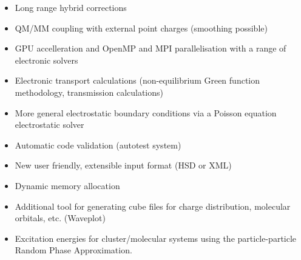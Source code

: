 \begin{itemize}
\item Long range hybrid corrections
\item QM/MM coupling with external point charges (smoothing possible)
\item GPU accelleration and OpenMP and MPI parallelisation with a
  range of electronic solvers
\item Electronic transport calculations (non-equilibrium Green function
  methodology, transmission calculations)
\item More general electrostatic boundary conditions via a Poisson equation
  electrostatic solver
\item Automatic code validation (autotest system)
\item New user friendly, extensible input format (HSD or XML)
\item Dynamic memory allocation
\item Additional tool for generating cube files for charge distribution,
  molecular orbitals, etc. (Waveplot)
\item Excitation energies for cluster/molecular systems using the particle-particle Random Phase Approximation.   
\end{itemize}
